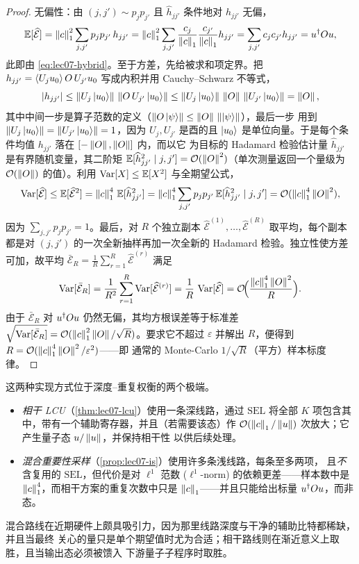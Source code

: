 \begin{proof}
无偏性：由 $(j,j')\sim p_jp_{j'}$ 且 $\widehat h_{jj'}$ 条件地对 $h_{jj'}$ 无偏，
\[
  \mathbb{E}[\widehat{\mathcal E}]
  =\left\lVert c \right\rVert_1^2\sum_{j,j'}p_j p_{j'}\,h_{jj'}
  =\left\lVert c \right\rVert_1^2\sum_{j,j'}\frac{c_j}{\left\lVert c \right\rVert_1}\frac{c_{j'}}{\left\lVert c \right\rVert_1}h_{jj'}
  =\sum_{j,j'}c_j c_{j'}h_{jj'}
  =u^{\dagger} Ou,
\]
此即由 \eqref{eq:lec07-hybrid}。至于方差，先给被求和项定界。把
$h_{jj'}=\braket{U_j u_0}{O\,U_{j'}u_0}$ 写成内积并用 Cauchy--Schwarz 不等式，
\[
  \left\lvert h_{jj'} \right\rvert\le\left\lVert U_j\ket{u_0} \right\rVert\,\left\lVert O\,U_{j'}\ket{u_0} \right\rVert
    \le\left\lVert U_j\ket{u_0} \right\rVert\,\left\lVert O \right\rVert\,\left\lVert U_{j'}\ket{u_0} \right\rVert=\left\lVert O \right\rVert,
\]
其中中间一步是算子范数的定义（$\left\lVert O\ket\psi \right\rVert\le\left\lVert O \right\rVert\,\left\lVert \ket\psi \right\rVert$），最后一步
用到 $\left\lVert U_j\ket{u_0} \right\rVert=\left\lVert U_{j'}\ket{u_0} \right\rVert=1$，因为 $U_j,U_{j'}$ 是酉的且
$\ket{u_0}$ 是单位向量。于是每个条件均值 $h_{jj'}$ 落在 $[-\left\lVert O \right\rVert,\left\lVert O \right\rVert]$ 内，而以它
为目标的 Hadamard 检验估计量 $\widehat h_{jj'}$ 是有界随机变量，其二阶矩
$\mathbb{E}[\widehat h_{jj'}^2\mid j,j']=\mathcal{O}(\left\lVert O \right\rVert^2)$（单次测量返回一个量级为
$\mathcal{O}(\left\lVert O \right\rVert)$ 的值）。利用 $\operatorname{Var}[X]\le\mathbb{E}[X^2]$ 与全期望公式，
\[
  \operatorname{Var}[\widehat{\mathcal E}]\le\mathbb{E}[\widehat{\mathcal E}^2]
  =\left\lVert c \right\rVert_1^4\,\mathbb{E}[\widehat h_{jj'}^2]
  =\left\lVert c \right\rVert_1^4\sum_{j,j'}p_j p_{j'}\,\mathbb{E}[\widehat h_{jj'}^2\mid j,j']
  =\mathcal{O}(\left\lVert c \right\rVert_1^4\left\lVert O \right\rVert^2),
\]
因为 $\sum_{j,j'}p_j p_{j'}=1$。最后，对 $R$ 个独立副本
$\widehat{\mathcal E}^{(1)},\dots,\widehat{\mathcal E}^{(R)}$ 取平均，每个副本都是对
$(j,j')$ 的一次全新抽样再加一次全新的 Hadamard 检验。独立性使方差可加，故平均
$\bar{\mathcal E}_R=\tfrac1R\sum_{r=1}^{R}\widehat{\mathcal E}^{(r)}$ 满足
\[
  \operatorname{Var}[\bar{\mathcal E}_R]=\frac1{R^2}\sum_{r=1}^{R}\operatorname{Var}[\widehat{\mathcal E}^{(r)}]
   =\frac1R\,\operatorname{Var}[\widehat{\mathcal E}]
   =\mathcal{O}\!\Bigl(\frac{\left\lVert c \right\rVert_1^4\left\lVert O \right\rVert^2}{R}\Bigr).
\]
由于 $\bar{\mathcal E}_R$ 对 $u^{\dagger} Ou$ 仍然无偏，其均方根误差等于标准差
$\sqrt{\operatorname{Var}[\bar{\mathcal E}_R]}=\mathcal{O}(\left\lVert c \right\rVert_1^2\left\lVert O \right\rVert/\sqrt R)$。要求它不超过
$\varepsilon$ 并解出 $R$，便得到 $R=\mathcal{O}(\left\lVert c \right\rVert_1^4\left\lVert O \right\rVert^2/\varepsilon^2)$——即
通常的 Monte-Carlo $1/\sqrt R$（平方）样本标度律。
\end{proof}

\begin{remark}[相干 vs.\ 混合：权衡取舍]
\label{rem:lec07-tradeoff}
这两种实现方式位于深度--重复权衡的两个极端。
\begin{itemize}[leftmargin=1.4em,nosep]
  \item \emph{相干 LCU}（\cref{thm:lec07-lcu}）使用一条深线路，通过 $\mathrm{SEL}$
        将全部 $K$ 项包含其中，带有一个辅助寄存器，并且（若需要该态）作
        $\mathcal{O}(\left\lVert c \right\rVert_1/\left\lVert u \right\rVert)$ 次放大；它产生量子态 $u/\left\lVert u \right\rVert$，并保持相干性
        以供后续处理。
  \item \emph{混合重要性采样}（\cref{prop:lec07-is}）使用许多条浅线路，每条至多两项，
        且\emph{不}含复用的 $\mathrm{SEL}$，但代价是对 $\ell^1$ 范数 ($\ell^1$-norm)
        的依赖更差——样本数中是 $\left\lVert c \right\rVert_1^4$，而相干方案的重复次数中只是
        $\left\lVert c \right\rVert_1$——并且只能给出标量 $u^{\dagger} Ou$，而非态。
\end{itemize}
混合路线在近期硬件上颇具吸引力，因为那里线路深度与干净的辅助比特都稀缺，并且当最终
关心的量只是单个期望值时尤为合适；相干路线则在渐近意义上取胜，且当输出态必须被馈入
下游量子子程序时取胜。
\end{remark}

